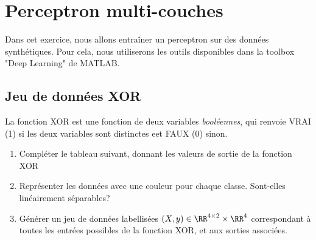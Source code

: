 \section{Perceptron multi-couches}

Dans cet exercice, nous allons entraîner un perceptron sur des données synthétiques. Pour cela, nous utiliserons les outils disponibles dans la toolbox "Deep Learning" de MATLAB.

\subsection{Jeu de données XOR}
La fonction XOR est une fonction de deux variables \emph{booléennes}, qui renvoie VRAI (1) si les deux variables sont distinctes eet FAUX (0) sinon.

\begin{enumerate}
	\item Compléter le tableau suivant, donnant les valeurs de sortie de la fonction XOR
	
	\item Représenter les données avec une couleur pour chaque classe. Sont-elles linéairement séparables?
	
	\item Générer un jeu de données labellisées $(X,y) \in \RR^{4\times 2} \times \RR^4$ correspondant à toutes les entrées possibles de la fonction XOR, et aux sorties associées.
	
\end{enumerate}
	
